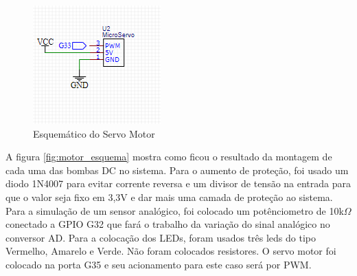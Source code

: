 \begin{figure}[h]
	\centering
	\label{fig:Servo_esquema}
		\includegraphics[keepaspectratio=true,scale=0.8]{figuras/servo.png}
	\caption{Esquemático do Servo Motor}
\end{figure}

A figura \ref{fig:motor_esquema} mostra como ficou o resultado da montagem de cada uma das bombas DC no sistema. Para o aumento de proteção, foi usado um diodo 1N4007 para evitar corrente reversa e um divisor de tensão na entrada para que o valor seja fixo em 3,3V e dar mais uma camada de proteção ao sistema. Para a simulação de um sensor analógico, foi colocado um potênciometro de 10k$\Omega$ conectado a GPIO G32 que fará o trabalho da variação do sinal analógico no conversor AD.
Para a colocação dos LEDs, foram usados três leds do tipo Vermelho, Amarelo e Verde. Não foram colocados resistores. O servo motor foi colocado na porta G35 e seu acionamento para este caso será por PWM.




